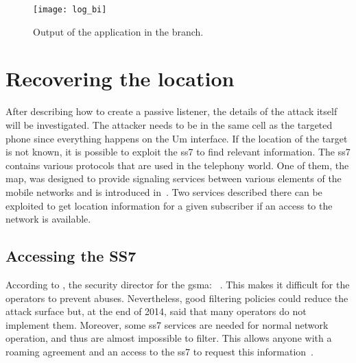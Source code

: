     \begin{figure}[h]
      \centering
      \texttt{[image: log\_bi]}
      \caption{Output of the  application in the
         branch.}
      \label{fig:log_bi}
    \end{figure}

    \iffalse On Mon, Aug 29, 2011 at 01:55:59AM +0200, Lukas Kuzmiak
    wrote: > If I'm not mistaken pl2303 based cables have/had problems
    handling baudrates > above 115200, there was a recent update into
    the kernel tree, but I've never > tested it.

the problem is not "[standard] baud rates above 115200" but it is
"non-standard baud-rates at all".  Normal USARTs have baud-rate
generators that can only generate baud-rates "input_clock / divider"
where divider is either an integer, or even more: limited to a power of
2

The calypso cannot do any standard baud-rates above 115200.  That's why
you need a USART with more flexible baud rate generator.  The most
commonly known one to do this is the FTDI series of USB-serial
converters. 
    \fi

  \section{Recovering the location}

    After describing how to create a passive listener, the details of
    the attack itself will be investigated. The attacker needs to be in
    the same cell as the targeted phone since everything happens on the
    Um interface. If the location of the target is not known, it is
    possible to exploit the \gls{ss7} to find relevant information. The
    \gls{ss7} contains various protocols that are used in the telephony
    world. One of them, the \gls{map}, was designed to provide signaling
    services between various elements of the mobile networks and is
    introduced in~. Two services described there can be
    exploited to get location information for a given subscriber if an
    access to the network is available.

    \subsection{Accessing the SS7}

      According to , the security director for the
      \gls{gsma}: ~\cite{timberg_for_2014}. This makes
      it difficult for the operators to prevent abuses. Nevertheless,
      good filtering policies could reduce the attack surface but, at
      the end of 2014,  said that many operators do
      not implement them. Moreover, some \gls{ss7} services are needed
      for normal network operation, and thus are almost impossible to
      filter. This allows anyone with a roaming agreement and an access
      to the \gls{ss7} to request this
      information~\cite{nohl_mobile_2014}.

